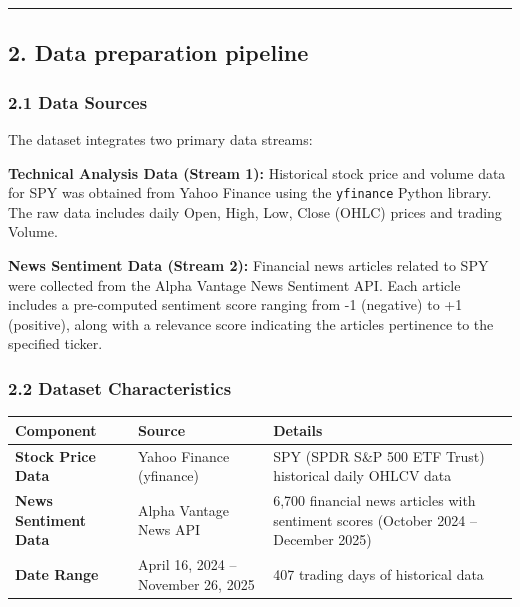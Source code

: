 \documentclass[
]{article}
\newcounter{none} %
\begin{document}
\begin{center}\rule{0.5\linewidth}{0.5pt}\end{center}

\subsection{2. Data preparation
pipeline}\label{2-data-preparation-pipeline}

\subsubsection{2.1 Data Sources}\label{21-data-sources}

The dataset integrates two primary data streams:

\textbf{Technical Analysis Data (Stream 1):} Historical stock price and
volume data for SPY was obtained from Yahoo Finance using the
\texttt{yfinance} Python library. The raw data includes daily Open,
High, Low, Close (OHLC) prices and trading Volume.

\textbf{News Sentiment Data (Stream 2):} Financial news articles related
to SPY were collected from the Alpha Vantage News Sentiment API. Each
article includes a pre-computed sentiment score ranging from -1
(negative) to +1 (positive), along with a relevance score indicating the
article\textquotesingle s pertinence to the specified ticker.

\subsubsection{2.2 Dataset
Characteristics}\label{22-dataset-characteristics}

{\def\LTcaptype{none} %
\begin{longtable}[]{@{}p{}p{}p{}@{}}
\toprule\noalign{}
Component & Source & Details \\
\midrule\noalign{}
\endhead
\bottomrule\noalign{}
\endlastfoot
\textbf{Stock Price Data} & Yahoo Finance (yfinance) & SPY (SPDR S\&P 500 ETF Trust) historical daily OHLCV data \\
\textbf{News Sentiment Data} & Alpha Vantage News API & 6,700 financial news articles with sentiment scores (October 2024 -- December 2025) \\
\textbf{Date Range} & April 16, 2024 -- November 26, 2025 & 407 trading days of historical data \\
\end{longtable}
}
\end{document}

